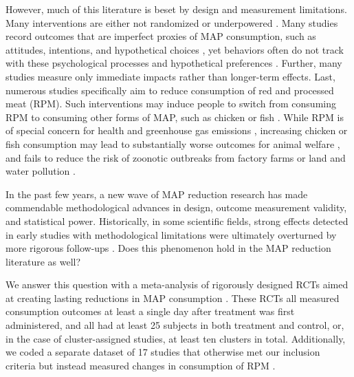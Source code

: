 \documentclass[sn-nature,referee,pdflatex]{sn-jnl}
\begin{document}
However, much of this literature is beset by design and measurement
limitations. Many interventions are either not randomized
\citep{garnett2020} or underpowered \citep{delichatsios2001}. Many
studies record outcomes that are imperfect proxies of MAP consumption,
such as attitudes, intentions, and hypothetical choices
\citep{raghoebar2020, vermeer2010}, yet behaviors often do not track
with these psychological processes
\citep{mathur2021effectiveness, porat2024} and hypothetical preferences
\citep{hensher2010}. Further, many studies measure only immediate
impacts \citep{hansen2021, griesoph2021} rather than longer-term
effects. Last, numerous studies specifically aim to reduce consumption
of red and processed meat (RPM). Such interventions may induce people to
switch from consuming RPM to consuming other forms of MAP, such as
chicken or fish \citep{grummon2023}. While RPM is of special concern for
health and greenhouse gas emissions \citep{abete2014, lescinsky2022},
increasing chicken or fish consumption may lead to substantially worse
outcomes for animal welfare \citep{mathur2022ethical}, and fails to
reduce the risk of zoonotic outbreaks from factory farms
\citep{hafez2020} or land and water pollution \citep{grvzinic2023}.

In the past few years, a new wave of MAP reduction research has made
commendable methodological advances in design, outcome measurement
validity, and statistical power. Historically, in some scientific
fields, strong effects detected in early studies with methodological
limitations were ultimately overturned by more rigorous follow-ups
\citep{wykes2008, paluck2019, scheel2021}. Does this phenomenon hold in
the MAP reduction literature as well?

We answer this question with a meta-analysis of rigorously designed RCTs
aimed at creating lasting reductions in MAP consumption
\citep{andersson2021, kanchanachitra2020, abrahamse2007, acharya2004, banerjee2019, bianchi2022, bochmann2017, bschaden2020, carfora2023, cooney2014, cooney2016, feltz2022, haile2021, hatami2018, hennessy2016, jalil2023, mathur2021effectiveness, merrill2009, norris2014, peacock2017, polanco2022, sparkman2021, weingarten2022, piester2020, aldoh2023, allen2002, camp2019, coker2022, sparkman2020, berndsen2005, bertolaso2015, fehrenbach2015, mattson2020, shreedhar2021}.
These RCTs all measured consumption outcomes at least a single day after
treatment was first administered, and all had at least 25 subjects in
both treatment and control, or, in the case of cluster-assigned studies,
at least ten clusters in total. Additionally, we coded a separate
dataset of 17 studies that otherwise met our inclusion criteria but
instead measured changes in consumption of RPM
\citep{anderson2017, carfora2017correlational, carfora2017randomised, carfora2019, carfora2019informational, delichatsios2001talking, dijkstra2022, emmons2005cancer, emmons2005project, jaacks2014, james2015, lee2018, lindstrom2015, perino2022, schatzkin2000, sorensen2005, wolstenholme2020}.
\end{document}
